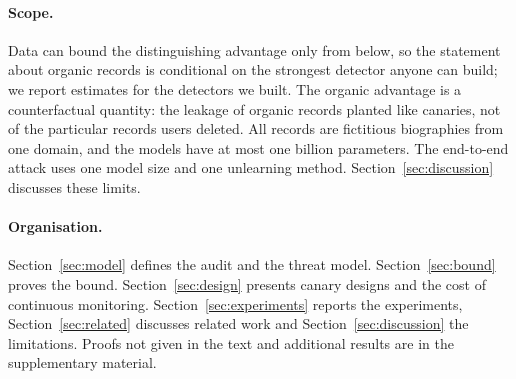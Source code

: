 \paragraph{Scope.} Data can bound the distinguishing advantage only from below, so the
statement about organic records is conditional on the strongest detector anyone can build;
we report estimates for the detectors we built. The organic advantage is a counterfactual
quantity: the leakage of organic records planted like canaries, not of the particular records
users deleted. All records are fictitious biographies from one domain,
and the models have at most one billion parameters. The end-to-end attack uses one
model size and one unlearning method. Section~\ref{sec:discussion} discusses
these limits.

\paragraph{Organisation.} Section~\ref{sec:model} defines the audit and the threat model.
Section~\ref{sec:bound} proves the bound. Section~\ref{sec:design} presents canary designs
and the cost of continuous monitoring. Section~\ref{sec:experiments} reports the
experiments, Section~\ref{sec:related} discusses related work and
Section~\ref{sec:discussion} the limitations. Proofs not given in the text and additional
results are in the supplementary material.
